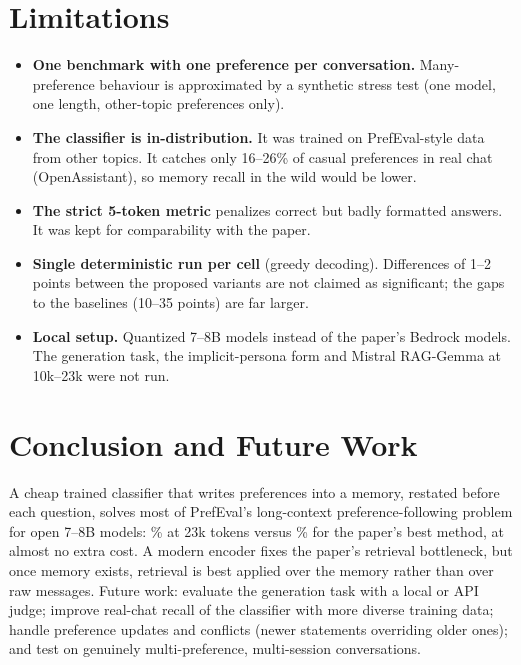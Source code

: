 \documentclass[lettersize,journal]{IEEEtran}
\begin{document}
\section{Limitations}
\begin{itemize}
  \item \textbf{One benchmark with one preference per conversation.} Many-preference behaviour is approximated by a synthetic stress test (one model,
        one length, other-topic preferences only).
  \item \textbf{The classifier is in-distribution.} It was trained on PrefEval-style data from other topics. It catches only 16--26\% of casual
        preferences in real chat (OpenAssistant), so memory recall in the wild would be lower.
  \item \textbf{The strict 5-token metric} penalizes correct but badly formatted answers. It was kept for comparability with the paper.
  \item \textbf{Single deterministic run per cell} (greedy decoding). Differences of 1--2 points between the proposed variants are not claimed as significant;
        the gaps to the baselines (10--35 points) are far larger.
  \item \textbf{Local setup.} Quantized 7--8B models instead of the paper's Bedrock models. The generation task, the implicit-persona form and
        Mistral RAG-Gemma at 10k--23k were not run.
\end{itemize}

\section{Conclusion and Future Work}
A cheap trained classifier that writes preferences into a memory, restated before each question, solves most of PrefEval's long-context
preference-following problem for open 7--8B models: \qMiMemTwentyThree\% at 23k tokens versus \qMiRagTwentyThree\% for the paper's best method, at
almost no extra cost. A modern encoder fixes the paper's retrieval bottleneck, but once memory exists, retrieval is best applied over the memory
rather than over raw messages. Future work: evaluate the generation task with a local or API judge; improve real-chat recall of the classifier
with more diverse training data; handle preference updates and conflicts (newer statements overriding older ones); and test on genuinely
multi-preference, multi-session conversations.
\end{document}
